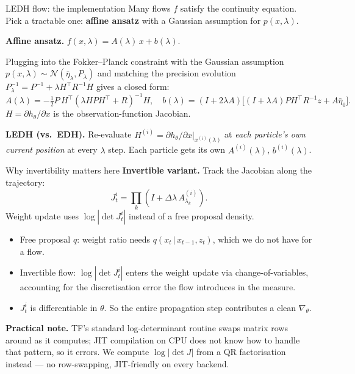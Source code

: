 \documentclass[10pt,aspectratio=169]{beamer}
\newcommand{\given}{\,|\,}
\begin{document}
\begin{frame}{LEDH flow: the implementation}
  Many flows $f$ satisfy the continuity equation. Pick a tractable one: \textbf{affine ansatz} with a Gaussian assumption for $p(x, \lambda)$.

  \medskip
  \textbf{Affine ansatz.} $f(x, \lambda) = A(\lambda)\, x + b(\lambda)$.

  \medskip
  Plugging into the Fokker--Planck constraint with the Gaussian assumption $p(x, \lambda) \sim \mathcal{N}(\bar\eta_\lambda, P_\lambda)$ and matching the precision evolution $P_\lambda^{-1} = P^{-1} + \lambda H^\top R^{-1} H$ gives a closed form:
  \[
    A(\lambda) = -\tfrac{1}{2} P\, H^\top (\lambda H P H^\top + R)^{-1} H,
    \quad
    b(\lambda) = (I + 2\lambda A)\big[(I + \lambda A) P H^\top R^{-1} z + A \bar\eta_0\big].
  \]
  $H = \partial h_\theta / \partial x$ is the observation-function Jacobian.

  \medskip
  \textbf{LEDH (vs.\ EDH).} Re-evaluate $H^{(i)} = \partial h_\theta / \partial x \big|_{x^{(i)}(\lambda)}$ at \emph{each particle's own current position} at every $\lambda$ step. Each particle gets its own $A^{(i)}(\lambda)$, $b^{(i)}(\lambda)$.

\end{frame}

\begin{frame}{Why invertibility matters here}
  \textbf{Invertible variant.} Track the Jacobian along the trajectory:
  \[
    J_t^i = \prod_{k} (I + \Delta\lambda\, A_{\lambda_k}^{(i)}).
  \]
  Weight update uses $\log|\det J_t^i|$ instead of a free proposal density.

  \medskip
  \begin{itemize}
    \item Free proposal $q$: weight ratio needs $q(x_t\given x_{t-1}, z_t)$, which we do not have for a flow.
    \item Invertible flow: $\log|\det J_t^i|$ enters the weight update via change-of-variables, accounting for the discretisation error the flow introduces in the measure.
    \item $J_t^i$ is differentiable in $\theta$. So the entire propagation step contributes a clean $\nabla_\theta$.
  \end{itemize}

  \medskip
  \textbf{Practical note.} TF's standard log-determinant routine swaps matrix rows around as it computes; JIT compilation on CPU does not know how to handle that pattern, so it errors. We compute $\log|\det J|$ from a QR factorisation instead --- no row-swapping, JIT-friendly on every backend.
\end{frame}
\end{document}
